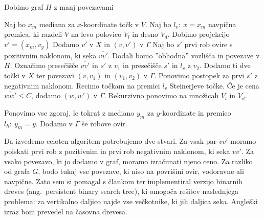 \documentclass{article}
\begin{document}
\begin{algorithm}
    \caption{Dobimo graf $H$ z manj povezavami}
    \label{alg:sparseGraph}
    \begin{algorithmic}[1]
        \State Naj bo $x_m$ mediana za $x$-koordinate točk v $V$. 
        \State  Naj bo $l_v: \ x = x_m$ navpična premica, ki razdeli $V$ na levo polovico $V_l$ in desno $V_d$.
            \State Dobimo projekcijo $v' = (x_m,v_y)$
                \State Dodamo $v'$ v $X$ in $(v,v')$ v $\Gamma$
            \EndIf
            \State Naj bo $s'$ prvi rob ovire s pozitivnim naklonom, ki seka $\overline{vv'}$. 
                \State Dodali bomo ''obhodna'' vozlišča in povezave v $H$.
                \State Označimo presečišče $\overline{vv'}$ in $s'$ z $v_1$ in presečišče $s'$ in $l_v$ z $v_2$. 
                \State Dodamo ti dve točki v $X$ ter povezavi $(v,v_1)$ in $(v_1,v_2)$ v $\Gamma$.
            \EndIf
            \State Ponovimo postopek za prvi $s'$ z negativnim naklonom.
            \State Recimo točkam na premici $l_v$ Steinerjeve točke.
                \State Če je cena $\overline{ww'} \leq C$, dodamo $(w,w')$ v $\Gamma$.
            \EndFor
        \EndFor
        \State Rekurzivno ponovimo na množicah $V_l$ in $V_d$.
        
        \State Ponovimo vse zgoraj, le tokrat z mediano $y_m$ za $y$-koordinate  in premico $l_h: \ y_m = y$.
        \State Dodamo v $\Gamma$ še robove ovir.
    \end{algorithmic}
\end{algorithm}

Da izvedemo celoten algoritem potrebujemo dve stvari. Za vsak par $vv'$ moramo poiskati prvi rob z pozitivnim in prvi rob negativnim naklonom, ki seka $\overline{vv'}$. Za vsako povezavo, ki jo dodamo v graf, moramo izračunati njeno ceno. Za razliko od grafa $G$, bodo tukaj vse povezave, ki niso na povrišini ovir, vodoravne ali navpične. Zato sem si pomagal s člankom \cite{SnT} ter implementiral verzijo binarnih dreves (ang.\ persistent binary search tree), ki omogoča rešitev naslednjega problema: za vertikalno daljico najde vse večkotnike, ki jih daljica seka. Angleški izraz bom prevedel na časovna drevesa.
\end{document}
